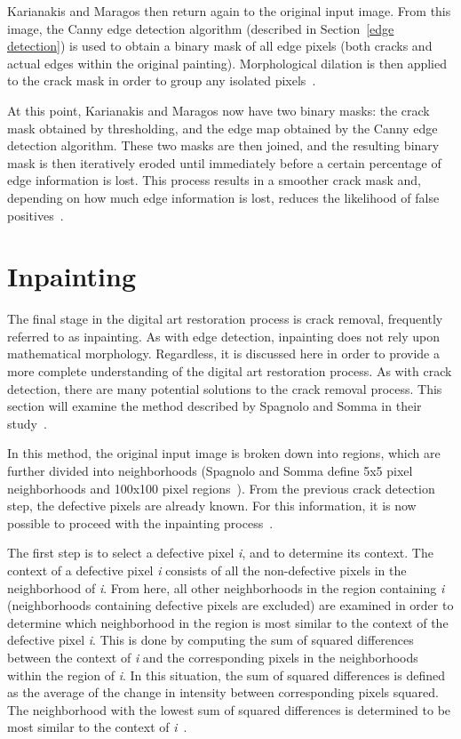 \documentclass{sig-alternate}
\begin{document}
Karianakis and Maragos then return again to the original input image. From this image, the Canny edge detection algorithm (described in Section~\ref{edge detection}) is used to obtain a binary mask of all edge pixels (both cracks and actual edges within the original painting). Morphological dilation is then applied to the crack mask in order to group any isolated pixels~\cite{Theran:2013}.

At this point, Karianakis and Maragos now have two binary masks: the crack mask obtained by thresholding, and the edge map obtained by the Canny edge detection algorithm. These two masks are then joined, and the resulting binary mask is then iteratively eroded until immediately before a certain percentage of edge information is lost. This process results in a smoother crack mask and, depending on how much edge information is lost, reduces the likelihood of false positives~\cite{Theran:2013}.

\section{Inpainting}\label{inpainting}
The final stage in the digital art restoration process is crack removal, frequently referred to as inpainting. As with edge detection, inpainting does not rely upon mathematical morphology. Regardless, it is discussed here in order to provide a more complete understanding of the digital art restoration process. As with crack detection, there are many potential solutions to the crack removal process. This section will examine the method described by Spagnolo and Somma in their study~\cite{TopHat:2010}.

In this method, the original input image is broken down into regions, which are further divided into neighborhoods (Spagnolo and Somma define 5x5 pixel neighborhoods and 100x100 pixel regions~\cite{TopHat:2010}). From the previous crack detection step, the defective pixels are already known. For this information, it is now possible to proceed with the inpainting process~\cite{TopHat:2010}.

The first step is to select a defective pixel \textit{i}, and to determine its context. The context of a defective pixel \textit{i} consists of all the non-defective pixels in the neighborhood of \textit{i}. From here, all other neighborhoods in the region containing \textit{i} (neighborhoods containing defective pixels are excluded) are examined in order to determine which neighborhood in the region is most similar to the context of the defective pixel \textit{i}. This is done by computing the sum of squared differences between the context of \textit{i} and the corresponding pixels in the neighborhoods within the region of \textit{i}. In this situation, the sum of squared differences is defined as the average of the change in intensity between corresponding pixels squared. The neighborhood with the lowest sum of squared differences is determined to be most similar to the context of \textit{i}~\cite{TopHat:2010}.
\end{document}
